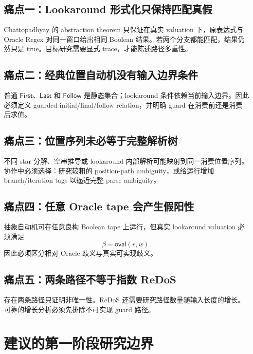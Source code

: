 \documentclass[UTF8,a4paper,12pt]{ctexart}
\newcommand{\ovalfn}{\mathsf{oval}}
\begin{document}
\subsection{痛点一：Lookaround 形式化只保持匹配真假}

Chattopadhyay 的 abstraction theorem 只保证在真实 valuation 下，原表达式与 Oracle Regex 对同一窗口给出相同 Boolean 结果。若两个分支都能匹配，结果仍然只是 true。目标研究需要显式 trace，才能陈述路径多重性。

\subsection{痛点二：经典位置自动机没有输入边界条件}

普通 $\mathsf{First}$、$\mathsf{Last}$ 和 $\mathsf{Follow}$ 是静态集合；lookaround 条件依赖当前输入边界。因此必须定义 guarded initial/final/follow relation，并明确 guard 在消费前还是消费后求值。

\subsection{痛点三：位置序列未必等于完整解析树}

不同 star 分解、空串推导或 lookaround 内部解析可能映射到同一消费位置序列。协作中必须选择：研究较粗的 position-path ambiguity，或给运行增加 branch/iteration tags 以逼近完整 parse ambiguity。

\subsection{痛点四：任意 Oracle tape 会产生假阳性}

抽象自动机可在任意良构 Boolean tape 上运行，但真实 lookaround valuation 必须满足
\[
\beta=\ovalfn(r,w).
\]
因此必须区分相对 Oracle 歧义与真实可实现歧义。

\subsection{痛点五：两条路径不等于指数 ReDoS}

存在两条路径只证明非唯一性。ReDoS 还需要研究路径数量随输入长度的增长。可靠的增长分析必须先排除不可实现 guard 路径。

\section{建议的第一阶段研究边界}
\end{document}
